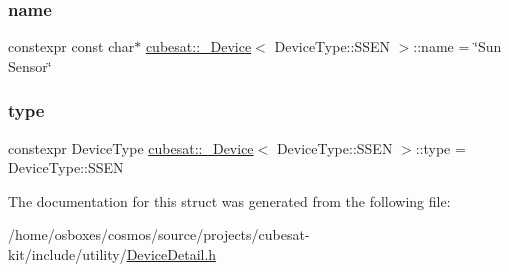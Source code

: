 \subsubsection{\texorpdfstring{name}{name}}
{\footnotesize\ttfamily constexpr const char$\ast$ \hyperlink{structcubesat_1_1__Device}{cubesat\+::\+\_\+\+Device}$<$ Device\+Type\+::\+S\+S\+EN $>$\+::name = \char`\"{}Sun Sensor\char`\"{}\hspace{0.3cm}{\ttfamily [static]}}

\mbox{\label{structcubesat_1_1__Device_3_01DeviceType_1_1SSEN_01_4_af1283b739fcee5ddf51e14d4d65e5443}} 
\subsubsection{\texorpdfstring{type}{type}}
{\footnotesize\ttfamily constexpr Device\+Type \hyperlink{structcubesat_1_1__Device}{cubesat\+::\+\_\+\+Device}$<$ Device\+Type\+::\+S\+S\+EN $>$\+::type = Device\+Type\+::\+S\+S\+EN\hspace{0.3cm}{\ttfamily [static]}}



The documentation for this struct was generated from the following file\+:\begin{DoxyCompactItemize}
\item 
/home/osboxes/cosmos/source/projects/cubesat-\/kit/include/utility/\hyperlink{DeviceDetail_8h}{Device\+Detail.\+h}\end{DoxyCompactItemize}

